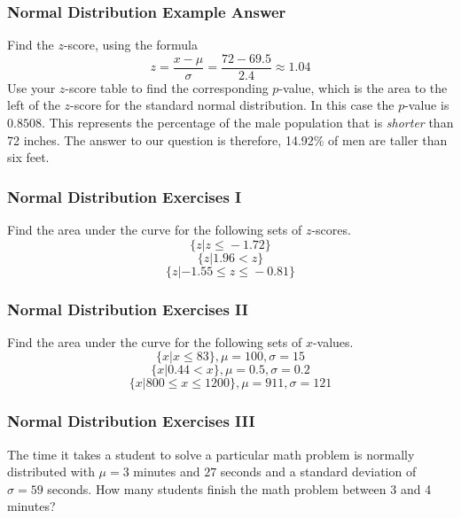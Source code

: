 \documentclass[xcolor=dvipsnames]{beamer}
\begin{document}
\begin{frame}
  \frametitle{Normal Distribution Example Answer}
  Find the $z$-score, using the formula
  \begin{equation}
    \label{eq:eejecheo}
    z=\frac{x-\mu}{\sigma}=\frac{72-69.5}{2.4}\approx{}1.04
  \end{equation}
  Use your $z$-score table to find the corresponding
  \alert{$p$-value}, which is the area to the left of the $z$-score
  for the standard normal distribution. In this case the $p$-value is
  $0.8508$. This represents the percentage of the male population that
  is \emph{shorter} than 72 inches. The answer to our question is
  therefore, 14.92\% of men are taller than six feet.
\end{frame}

\begin{frame}
  \frametitle{Normal Distribution Exercises I}
{\ubung} Find the area under the curve for the following sets of
$z$-scores. 
\begin{equation}
  \label{eq:deapheph}
\{z|z\leq{}-1.72\}  
\end{equation}
\begin{equation}
  \label{eq:taedaiga}
\{z|1.96<{}z\}  
\end{equation}
\begin{equation}
  \label{eq:ahraefis}
\{z|-1.55\leq{}z\leq{}-0.81\}
\end{equation}
\end{frame}

\begin{frame}
  \frametitle{Normal Distribution Exercises II}
{\ubung} Find the area under the curve for the
following sets of $x$-values. 
\begin{equation}
  \label{eq:aequaixe}
\{x|x\leq{}83\},\mu=100,\sigma=15
\end{equation}
\begin{equation}
  \label{eq:oocohdau}
\{x|0.44<x\},\mu=0.5,\sigma=0.2  
\end{equation}
\begin{equation}
  \label{eq:aethohph}
\{x|800\leq{}x\leq{}1200\},\mu=911,\sigma=121
\end{equation}
\end{frame}

\begin{frame}
  \frametitle{Normal Distribution Exercises III}
{\ubung} The time it takes a student to solve a particular math problem is
normally distributed with $\mu=3$ minutes and $27$ seconds and a
standard deviation of $\sigma=59$ seconds. How many students finish
the math problem between 3 and 4 minutes?
\end{frame}
\end{document}
